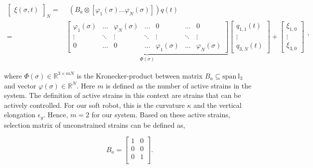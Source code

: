\begin{equation}
\begin{aligned}
    \begin{bmatrix}\xi(\sigma,t)\end{bmatrix}_N = & \hspace{5pt}  (B_a \otimes [ \varphi_1(\sigma) \dots \varphi_N(\sigma) ])q(t)\\ = &  \underbrace{ \begin{bmatrix}
    \varphi_1(\sigma) & \dots  & \varphi_N(\sigma) & \dots     & 0      & \dots  &  0 \\
    \vdots    & \ddots & \vdots    & \ddots    & \vdots & \ddots & \vdots \\
    0         & \dots  & 0         & \dots     & \varphi_1(\sigma) & \dots & \varphi_N (\sigma)
    \end{bmatrix}}_{\Phi(\sigma)} \begin{bmatrix} q_{1,1}(t) \\ \vdots \\ q_{3,N}(t) \end{bmatrix} +  \begin{bmatrix} \xi_{1,0} \\ \vdots \\ \xi_{3,0}   \end{bmatrix}
    \end{aligned},
\label{eq2:xishape}
\end{equation}

where $\Phi(\sigma) \in \mathbb{R}^{3 \times mN}$ is the Kronecker-product between matrix $B_a \subseteq \text{span} \hspace{2pt} \mathbb{I}_3$ and vector $\varphi(\sigma) \in \mathbb{R}^N$. Here $m$ is defined as the number of active strains in the system. The definition of active strains in this context are strains that can be actively controlled. For our soft robot, this is the curvature $\kappa$ and the vertical elongation $\epsilon_y$. Hence, $m=2$ for our system. Based on these active strains, selection matrix of unconstrained strains can be defined as,

\begin{equation}
    B_a = \begin{bmatrix}
    1 & 0 \\
    0 & 0  \\
    0 & 1  \\
    \end{bmatrix}.
    \label{eq2:Ba}
\end{equation}

